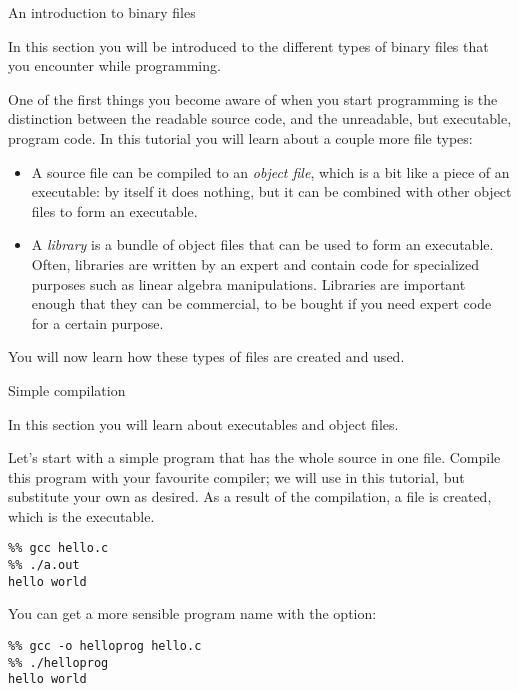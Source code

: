 
 {An introduction to binary files}

\begin{purpose}
  In this section you will be introduced to the different types of
  binary files that you encounter while programming.
\end{purpose}

One of the first things you become aware of when you start programming
is the distinction between the readable source code, and the
unreadable, but executable, program code. In this tutorial you will
learn about a couple more file types:
\begin{itemize}
\item A source file can be compiled to an \emph{object file}, which is
  a bit like a piece of an executable: by itself it does nothing, but
  it can be combined with other object files to form an executable.
\item A \emph{library} is a bundle of object files that can be used to
  form an executable. Often, libraries are written by an expert and
  contain code for specialized purposes such as linear algebra
  manipulations. Libraries are important enough that they can be
  commercial, to be bought if you need expert code for a certain purpose.
\end{itemize}
You will now learn how these types of files are created and used.

 {Simple compilation}

\begin{purpose}
  In this section you will learn about executables and object files.
\end{purpose}

Let's start with a simple program that has the whole source in one
file.
Compile this program with your favourite compiler; we will use 
in this tutorial, but substitute your own as desired. As a result of
the compilation, a file  is created, which is the executable.
\begin{verbatim}
%% gcc hello.c
%% ./a.out
hello world
\end{verbatim}
You can get a more sensible program name with the  option:
\begin{verbatim}
%% gcc -o helloprog hello.c
%% ./helloprog
hello world
\end{verbatim}


